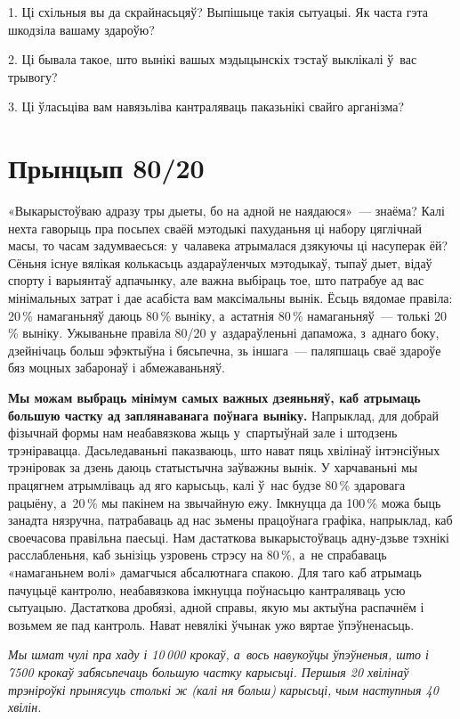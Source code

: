 1. Ці схільныя вы да скрайнасьцяў? Выпішыце такія сытуацыі. Як часта гэта шкодзіла вашаму здароўю?

2. Ці бывала такое, што вынікі вашых мэдыцынскіх тэстаў выклікалі ў~вас трывогу?

3. Ці ўласьціва вам навязьліва кантраляваць паказьнікі свайго арганізма?


\section{Прынцып 80/20}

«Выкарыстоўваю адразу тры дыеты, бо на адной не наядаюся»~--- знаёма? Калі нехта гаворыць пра посьпех сваёй мэтодыкі пахуданьня ці набору цяглічнай масы, то часам задумваесься: у~чалавека атрымалася дзякуючы ці насуперак ёй? Сёньня існуе вялікая колькасьць аздараўленчых мэтодыкаў, тыпаў дыет, відаў спорту і варыянтаў адпачынку, але важна выбіраць тое, што патрабуе ад вас мінімальных затрат і дае асабіста вам максімальны вынік. Ёсьць вядомае правіла: 20\,\% намаганьняў даюць 80\,\% выніку, а~астатнія 80\,\% намаганьняў~--- толькі 20\,\% выніку. Ужываньне правіла 80/20 у~аздараўленьні дапаможа, з~аднаго боку, дзейнічаць больш эфэктыўна і бясьпечна, зь іншага~--- паляпшаць сваё здароўе бяз моцных забаронаў і абмежаваньняў.

\textbf{Мы можам выбраць мінімум самых важных дзеяньняў, каб атрымаць большую частку ад заплянаванага поўнага выніку.} Напрыклад, для добрай фізычнай формы нам неабавязкова жыць у~спартыўнай зале і штодзень трэніравацца. Дасьледаваньні паказваюць, што нават пяць хвілінаў інтэнсіўных трэніровак за дзень даюць статыстычна заўважны вынік. У харчаваньні мы працягнем атрымліваць ад яго карысьць, калі ў~нас будзе 80\,\% здаровага рацыёну, а~20\,\% мы пакінем на звычайную ежу. Імкнуцца да 100\,\% можа быць занадта нязручна, патрабаваць ад нас зьмены працоўнага графіка, напрыклад, каб своечасова правільна паесьці. Нам дастаткова выкарыстоўваць адну-дзьве тэхнікі расслабленьня, каб зьнізіць узровень стрэсу на 80\,\%, а~не спрабаваць «намаганьнем волі» дамагчыся абсалютнага спакою. Для таго каб атрымаць пачуцьцё кантролю, неабавязкова імкнуцца поўнасьцю кантраляваць усю сытуацыю. Дастаткова дробязі, адной справы, якую мы актыўна распачнём і возьмем яе пад кантроль. Нават невялікі ўчынак ужо вяртае ўпэўненасьць.

\emph{Мы шмат чулі пра хаду і 10\,000 крокаў, а~вось навукоўцы ўпэўненыя, што і 7500 крокаў забясьпечаць большую частку карысьці. Першыя 20 хвілінаў трэніроўкі прынясуць столькі ж (калі ня больш) карысьці, чым наступныя 40 хвілін.}

